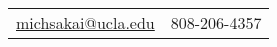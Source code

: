 \documentclass[10pt]{article} %
\begin{document}
\setlength{\parskip}{\baselineskip}%



	\\%
	\noindent\begin{tabular}{r @{$\quad\bullet\quad$} l}
		\href{mailto:michsakai@ucla.edu}{michsakai@ucla.edu} & 808-206-4357
	\end{tabular}

%


%
\end{document}

